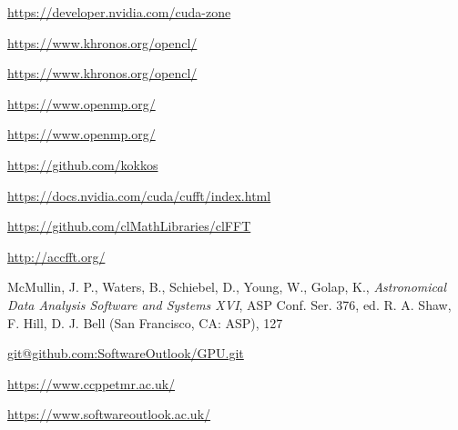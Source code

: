 \documentclass[12pt, a4paper]{article}
\begin{document}
\begin{thebibliography}{9}

\hyperlink{https://developer.nvidia.com/cuda-zone}{https://developer.nvidia.com/cuda-zone}

\hyperlink{https://www.khronos.org/opencl/}{https://www.khronos.org/opencl/}
  
\hyperlink{https://www.khronos.org/opencl/}{https://www.khronos.org/opencl/}

\hyperlink{https://www.openmp.org/}{https://www.openmp.org/}
  
\hyperlink{https://www.openmp.org/}{https://www.openmp.org/}

\hyperlink{https://github.com/kokkos}{https://github.com/kokkos}

\hyperlink{https://docs.nvidia.com/cuda/cufft/index.html}{https://docs.nvidia.com/cuda/cufft/index.html}

  \hyperlink{https://github.com/clMathLibraries/clFFT}{https://github.com/clMathLibraries/clFFT}
  
\hyperlink{http://accfft.org/}{http://accfft.org/}

McMullin, J. P., Waters, B., Schiebel, D., Young, W., Golap, K.,
{\it Astronomical Data Analysis Software and Systems XVI},
ASP Conf. Ser. 376, ed. R. A. Shaw, F. Hill, D. J. Bell (San Francisco, CA: ASP), 127

\hyperlink{git@github.com:SoftwareOutlook/GPU.git}{git@github.com:SoftwareOutlook/GPU.git}
    
\hyperlink{https://www.ccppetmr.ac.uk/}{https://www.ccppetmr.ac.uk/}

\hyperlink{https://www.softwareoutlook.ac.uk/}{https://www.softwareoutlook.ac.uk/}
  
\end{thebibliography}
\end{document}
